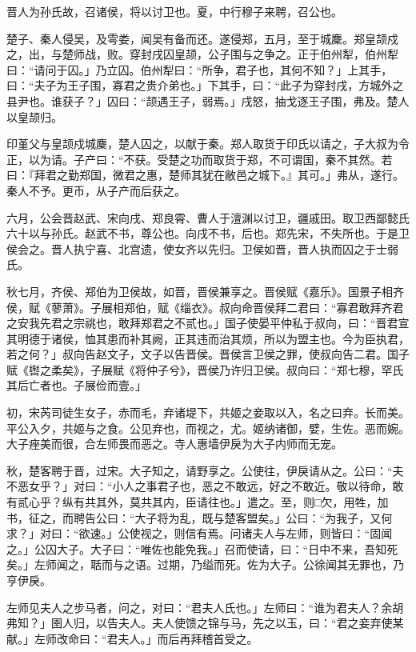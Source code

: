 \documentclass[]{article}
\begin{document}
晋人为孙氏故，召诸侯，将以讨卫也。夏，中行穆子来聘，召公也。

楚子、秦人侵吴，及雩娄，闻吴有备而还。遂侵郑，五月，至于城麇。郑皇颉戍之，出，与楚师战，败。穿封戌囚皇颉，公子围与之争之。正于伯州犁，伯州犁曰：``请问于囚。」乃立囚。伯州犁曰：``所争，君子也，其何不知？」上其手，曰：``夫子为王子围，寡君之贵介弟也。」下其手，曰：``此子为穿封戌，方城外之县尹也。谁获子？」囚曰：``颉遇王子，弱焉。」戌怒，抽戈逐王子围，弗及。楚人以皇颉归。

印堇父与皇颉戍城麇，楚人囚之，以献于秦。郑人取货于印氏以请之，子大叔为令正，以为请。子产曰：``不获。受楚之功而取货于郑，不可谓国，秦不其然。若曰：『拜君之勤郑国，微君之惠，楚师其犹在敝邑之城下。』其可。」弗从，遂行。秦人不予。更币，从子产而后获之。

六月，公会晋赵武、宋向戌、郑良霄、曹人于澶渊以讨卫，疆戚田。取卫西鄙懿氏六十以与孙氏。赵武不书，尊公也。向戌不书，后也。郑先宋，不失所也。于是卫侯会之。晋人执宁喜、北宫遗，使女齐以先归。卫侯如晋，晋人执而囚之于士弱氏。

秋七月，齐侯、郑伯为卫侯故，如晋，晋侯兼享之。晋侯赋《嘉乐》。国景子相齐侯，赋《蓼萧》。子展相郑伯，赋《缁衣》。叔向命晋侯拜二君曰：``寡君敢拜齐君之安我先君之宗祧也，敢拜郑君之不贰也。」国子使晏平仲私于叔向，曰：``晋君宣其明德于诸侯，恤其患而补其阙，正其违而治其烦，所以为盟主也。今为臣执君，若之何？」叔向告赵文子，文子以告晋侯。晋侯言卫侯之罪，使叔向告二君。国子赋《辔之柔矣》，子展赋《将仲子兮》，晋侯乃许归卫侯。叔向曰：``郑七穆，罕氏其后亡者也。子展俭而壹。」

初，宋芮司徒生女子，赤而毛，弃诸堤下，共姬之妾取以入，名之曰弃。长而美。平公入夕，共姬与之食。公见弃也，而视之，尤。姬纳诸御，嬖，生佐。恶而婉。大子痤美而很，合左师畏而恶之。寺人惠墙伊戾为大子内师而无宠。

秋，楚客聘于晋，过宋。大子知之，请野享之。公使往，伊戾请从之。公曰：``夫不恶女乎？」对曰：``小人之事君子也，恶之不敢远，好之不敢近。敬以待命，敢有贰心乎？纵有共其外，莫共其内，臣请往也。」遣之。至，则□欠，用牲，加书，征之，而聘告公曰：``大子将为乱，既与楚客盟矣。」公曰：``为我子，又何求？」对曰：``欲速。」公使视之，则信有焉。问诸夫人与左师，则皆曰：``固闻之。」公囚大子。大子曰：``唯佐也能免我。」召而使请，曰：``日中不来，吾知死矣。」左师闻之，聒而与之语。过期，乃缢而死。佐为大子。公徐闻其无罪也，乃亨伊戾。

左师见夫人之步马者，问之，对曰：``君夫人氏也。」左师曰：``谁为君夫人？余胡弗知？」圉人归，以告夫人。夫人使馈之锦与马，先之以玉，曰：``君之妾弃使某献。」左师改命曰：``君夫人。」而后再拜稽首受之。
\end{document}
